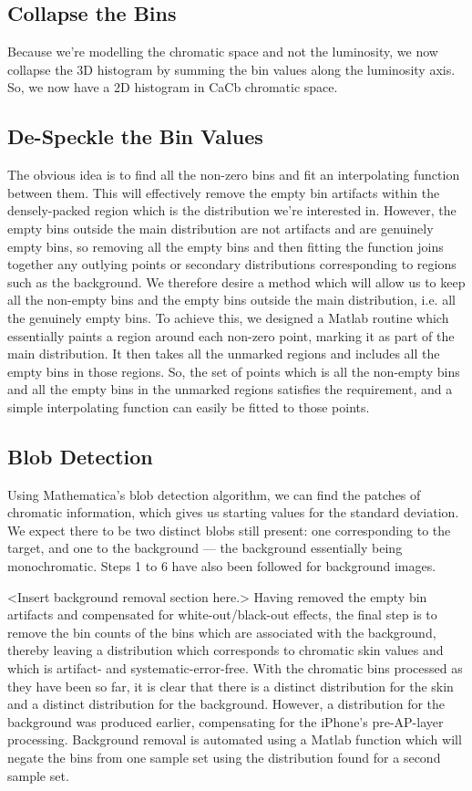 \subsection{Collapse the Bins}\label{sec:CollapsingTheBins}
Because we're modelling the chromatic space and not the luminosity, we now collapse the 3D histogram by summing the bin values along the luminosity axis. So, we now have a 2D histogram in CaCb chromatic space.


\subsection{De-Speckle the Bin Values}\label{sec:DeSpeckle}
The obvious idea is to find all the non-zero bins and fit an interpolating function between them. This will effectively remove the empty bin artifacts within the densely-packed region which is the distribution we're interested in. However, the empty bins outside the main distribution are not artifacts and are genuinely empty bins, so removing all the empty bins and then fitting the function joins together any outlying points or secondary distributions corresponding to regions such as the background. We therefore desire a method which will allow us to keep all the non-empty bins and the empty bins outside the main distribution, i.e. all the genuinely empty bins. To achieve this, we designed a Matlab routine which essentially paints a region around each non-zero point, marking it as part of the main distribution. It then takes all the unmarked regions and includes all the empty bins in those regions. So, the set of points which is all the non-empty bins and all the empty bins in the unmarked regions satisfies the requirement, and a simple interpolating function can easily be fitted to those points.


\subsection{Blob Detection}\label{sec:BlobDetection}
Using Mathematica's blob detection algorithm, we can find the patches of chromatic information, which gives us starting values for the standard deviation. We expect there to be two distinct blobs still present: one corresponding to the target, and one to the background --- the background essentially being monochromatic. Steps 1 to 6 have also been followed for background images. 

<Insert background removal section here.>
Having removed the empty bin artifacts and compensated for white-out/black-out effects, the final step is to remove the bin counts of the bins which are associated with the background, thereby leaving a distribution which corresponds to chromatic skin values and which is artifact- and systematic-error-free. With the chromatic bins processed as they have been so far, it is clear that there is a distinct distribution for the skin and a distinct distribution for the background. However, a distribution for the background was produced earlier, compensating for the iPhone's pre-AP-layer processing. Background removal is automated using a Matlab function which will negate the bins from one sample set using the distribution found for a second sample set.


